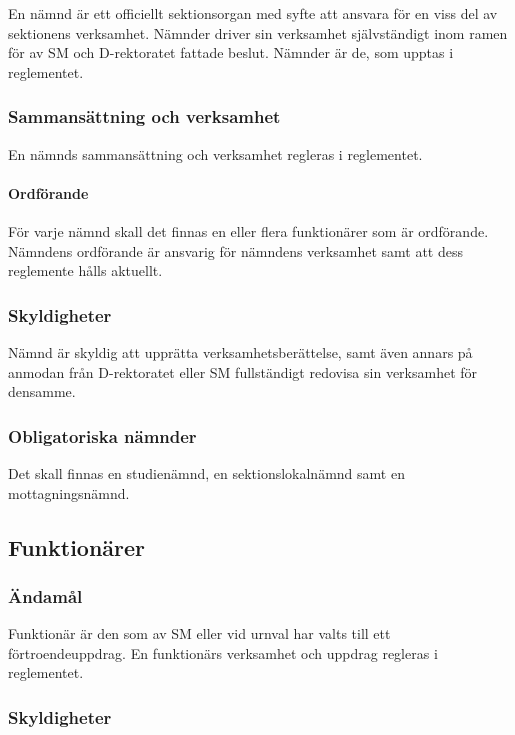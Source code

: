 \documentclass{dgovdoc}
\begin{document}
En nämnd är ett officiellt sektionsorgan med syfte att ansvara för en viss del
av sektionens verksamhet. Nämnder driver sin verksamhet självständigt inom
ramen för av SM och D-rektoratet fattade beslut. Nämnder är de, som upptas i
reglementet.

\subsubsection{Sammansättning och verksamhet}

En nämnds sammansättning och verksamhet regleras i reglementet.

\paragraph{Ordförande}

För varje nämnd skall det finnas en eller flera funktionärer som är ordförande.
Nämndens ordförande är ansvarig för nämndens verksamhet samt att dess
reglemente hålls aktuellt.

\subsubsection{Skyldigheter}

Nämnd är skyldig att upprätta verksamhetsberättelse, samt även annars på
anmodan från D-rektoratet eller SM fullständigt redovisa sin verksamhet för
densamme.

\subsubsection{Obligatoriska nämnder}

Det skall finnas en studienämnd, en sektionslokalnämnd samt en
mottagningsnämnd.

\subsection{Funktionärer}

\subsubsection{Ändamål}

Funktionär är den som av SM eller vid urnval har valts till ett
förtroendeuppdrag. En funktionärs verksamhet och uppdrag regleras i
reglementet.

\subsubsection{Skyldigheter}
\end{document}
